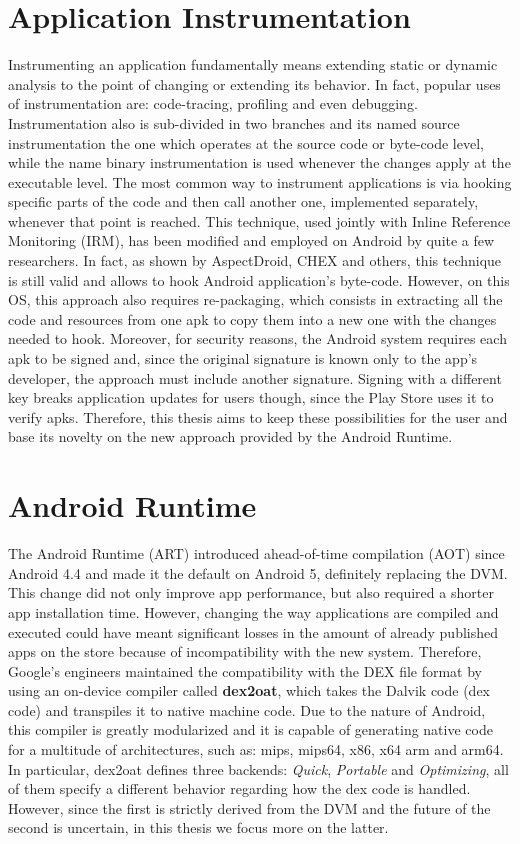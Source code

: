 \section{Application Instrumentation}
Instrumenting an application fundamentally means extending static or dynamic analysis to the point of changing or extending its behavior. In fact, popular uses of instrumentation are: code-tracing, profiling and even debugging. Instrumentation also is sub-divided in two branches and its named source instrumentation the one which operates at the source code or byte-code level, while the name binary instrumentation is used whenever the changes apply at the executable level. The most common way to instrument applications is via hooking specific parts of the code and then call another one, implemented separately, whenever that point is reached. This technique, used jointly with Inline Reference Monitoring (IRM)\cite{irm}, has been modified and employed on Android by quite a few researchers. In fact, as shown by AspectDroid\cite{AspectDroid}, CHEX\cite{chex} and others, this technique is still valid and allows to hook Android application's byte-code. However, on this OS, this approach also requires re-packaging, which consists in extracting all the code and resources from one apk to copy them into a new one with the changes needed to hook. Moreover, for security reasons, the Android system requires each apk to be signed and, since the original signature is known only to the app's developer, the approach must include another signature. Signing with a different key breaks application updates for users though, since the Play Store uses it to verify apks. Therefore, this thesis aims to keep these possibilities for the user and base its novelty on the new approach provided by the Android Runtime.


\section{Android Runtime}
The Android Runtime (ART) introduced ahead-of-time compilation (AOT) since Android 4.4 and made it the default on Android 5, definitely replacing  the DVM. This change did not only improve app performance, but also required a shorter app installation time. However, changing the way applications are compiled and executed could have meant significant losses in the amount of already published apps on the store because of incompatibility with the new system. Therefore, Google's engineers maintained the compatibility with the DEX file format by using an on-device compiler called \textbf{dex2oat}, which takes the Dalvik code (dex code) and transpiles it to native machine code. Due to the nature of Android, this compiler is greatly modularized and it is capable of generating native code for a multitude of architectures, such as: mips, mips64, x86, x64 arm and arm64. In particular, dex2oat defines three backends: \emph{Quick}, \emph{Portable} and \emph{Optimizing}, all of them specify a different behavior regarding how the dex code is handled. However, since the first is strictly derived from the DVM and the future of the second is uncertain\cite{artist}, in this thesis we focus more on the latter. 

